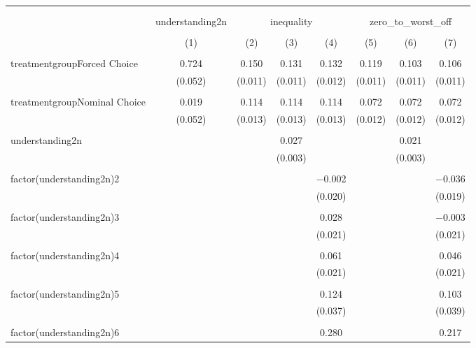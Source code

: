 
\begin{table}[!htbp] \centering 
  \caption{} 
  \label{} 
\begin{tabular}{@{\extracolsep{5pt}}lccccccc} 
\\[-1.8ex]\hline 
\hline \\[-1.8ex] 
\\[-1.8ex] & understanding2n & \multicolumn{3}{c}{inequality} & \multicolumn{3}{c}{zero\_to\_worst\_off} \\ 
\\[-1.8ex] & (1) & (2) & (3) & (4) & (5) & (6) & (7)\\ 
\hline \\[-1.8ex] 
 treatmentgroupForced Choice & 0.724 & 0.150 & 0.131 & 0.132 & 0.119 & 0.103 & 0.106 \\ 
  & (0.052) & (0.011) & (0.011) & (0.012) & (0.011) & (0.011) & (0.011) \\ 
  & & & & & & & \\ 
 treatmentgroupNominal Choice & 0.019 & 0.114 & 0.114 & 0.114 & 0.072 & 0.072 & 0.072 \\ 
  & (0.052) & (0.013) & (0.013) & (0.013) & (0.012) & (0.012) & (0.012) \\ 
  & & & & & & & \\ 
 understanding2n &  &  & 0.027 &  &  & 0.021 &  \\ 
  &  &  & (0.003) &  &  & (0.003) &  \\ 
  & & & & & & & \\ 
 factor(understanding2n)2 &  &  &  & $-$0.002 &  &  & $-$0.036 \\ 
  &  &  &  & (0.020) &  &  & (0.019) \\ 
  & & & & & & & \\ 
 factor(understanding2n)3 &  &  &  & 0.028 &  &  & $-$0.003 \\ 
  &  &  &  & (0.021) &  &  & (0.021) \\ 
  & & & & & & & \\ 
 factor(understanding2n)4 &  &  &  & 0.061 &  &  & 0.046 \\ 
  &  &  &  & (0.021) &  &  & (0.021) \\ 
  & & & & & & & \\ 
 factor(understanding2n)5 &  &  &  & 0.124 &  &  & 0.103 \\ 
  &  &  &  & (0.037) &  &  & (0.039) \\ 
  & & & & & & & \\ 
 factor(understanding2n)6 &  &  &  & 0.280 &  &  & 0.217 \\ 

\end{tabular}
\end{table}
